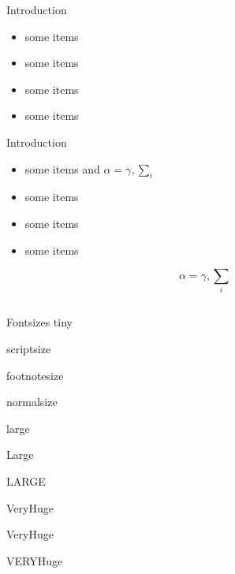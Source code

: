 \documentclass[final,hyperref={pdfpagelabels=false}]{beamer}
\begin{document}
\begin{frame}{}
\begin{columns}[T]
\begin{column}{.43\paperwidth}
        \begin{block}{Introduction}
        
          \begin{itemize}
          \item some items
          \item some items
          \item some items
          \item some items
          \end{itemize}
          
        \end{block}

        \begin{block}{Introduction}
        
          \begin{itemize}
          \item some items and $\alpha=\gamma, \sum_{i}$
          \item some items
          \item some items
          \item some items
          \end{itemize}
          $$\alpha=\gamma, \sum_{i}$$
          
        \end{block}
        
      \end{column}
            
      
    \end{columns}
    
  
    \vfill
    \begin{block}{\large Fontsizes}
      \centering
      {\tiny tiny}\par
      {\scriptsize scriptsize}\par
      {\footnotesize footnotesize}\par
      {\normalsize normalsize}\par
      {\large large}\par
      {\Large Large}\par
      {\LARGE LARGE}\par
      {\veryHuge VeryHuge}\par
      {\VeryHuge VeryHuge}\par
      {\VERYHuge VERYHuge}\par
           

\end{block}
\end{frame}
\end{document}
